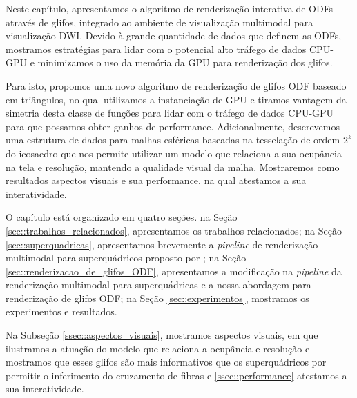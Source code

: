 
Neste capítulo, apresentamos o algoritmo de renderização interativa de ODFs através de glifos, integrado ao ambiente de visualização multimodal para visualização DWI. Devido à grande quantidade de dados que definem as ODFs, mostramos estratégias para lidar com o potencial alto tráfego de dados CPU-GPU e minimizamos o uso da memória da GPU para renderização dos glifos.

Para isto, propomos uma novo algoritmo de renderização de glifos ODF baseado em triângulos, no qual utilizamos a instanciação de GPU e tiramos vantagem da simetria desta classe de funções para lidar com o tráfego de dados CPU-GPU para que possamos obter ganhos de performance. Adicionalmente, descrevemos uma estrutura de dados para malhas esféricas baseadas na tesselação de ordem $2^k$ do icosaedro que nos permite utilizar um modelo que relaciona a sua ocupância na tela e resolução, mantendo a qualidade visual da malha. Mostraremos como resultados aspectos visuais e sua performance, na qual atestamos a sua interatividade.

O capítulo está organizado em quatro seções. na Seção \ref{sec::trabalhos_relacionados}, apresentamos os trabalhos relacionados; na Seção \ref{sec::superquadricas}, apresentamos brevemente a \textit{pipeline} de renderização multimodal para superquádricos proposto por ; na Seção \ref{sec::renderizacao_de_glifos_ODF}, apresentamos a modificação na \textit{pipeline} da renderização multimodal para superquádricas e a nossa abordagem para renderização de glifos ODF; na Seção \ref{sec::experimentos}, mostramos os experimentos e resultados.

Na Subseção \ref{ssec::aspectos_visuais}, mostramos aspectos visuais, em que ilustramos a atuação do modelo que relaciona a ocupância e resolução e mostramos que esses glifos são mais informativos que os superquádricos por permitir o inferimento do cruzamento de fibras e \ref{ssec::performance} atestamos a sua interatividade.




